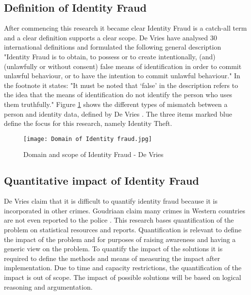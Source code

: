 \subsection{Definition of Identity Fraud}\label{Def_ID_Fraud}
After commencing this research it became clear Identity Fraud is a catch-all term and a clear definition supports a clear scope. De Vries \etal \cite{97408536fd1c4f4e9d1615b7a4a4473e} have analysed 30 international definitions and formulated the following general description "Identity Fraud is to obtain, to possess or to create intentionally, (and) (unlawfully or without consent) false means of identification in order to commit unlawful behaviour, or to have the intention to commit unlawful behaviour." In the footnote it states: "It must be noted that ‘false’ in the description refers to the idea that the means of identification do not identify the person who uses them truthfully."  
Figure \ref{fig:ID_fraud} shows the different types of mismatch between a person and identity data, defined by De Vries \etal \cite{Vries2007IdentiteitsfraudeEA}. The three items marked blue define the focus for this research, namely Identity Theft.

    \begin{figure}
        \graphicspath{ {./images/} }
        \texttt{[image: Domain of Identity fraud.jpg]}\\
        \caption{Domain and scope of Identity Fraud - De Vries \etal \cite{Vries2007IdentiteitsfraudeEA}}
        \label{fig:ID_fraud}
    \end{figure}

\subsection{Quantitative impact of Identity Fraud}\label{QI}
De Vries \etal claim that it is difficult to quantify identity fraud because it is incorporated in other crimes\cite{Vries2007IdentiteitsfraudeEA}. Goudriaan \etal claim many crimes in Western countries are not even reported to the police \cite{Gourdriaan_etal}. This research bases quantification of the problem on statistical resources and reports. Quantification is relevant to define the impact of the problem and for purposes of raising awareness and having a generic view on the problem. To quantify the impact of the solutions it is required to define the methods and means of measuring the impact after implementation. Due to time and capacity restrictions, the quantification of the impact is out of scope. The impact of possible solutions will be based on logical reasoning and argumentation.

